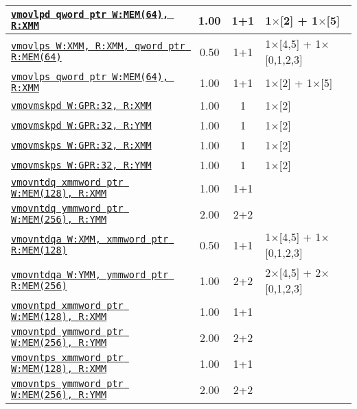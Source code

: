 \documentclass[a4paper,english,fontsize=9]{scrartcl}
\begin{document}
\begin{longtable}{p{}ccL{.25\textwidth}}
  \midrule
  \texttt{\href{https://felixcloutier.com/x86/MOVLPD.html}{vmovlpd qword ptr W:MEM(64), R:XMM}} & 1.00 & 1+1 & 1\(\times\)[2] + 1\(\times\)[5] \\
  \midrule
  \texttt{\href{https://felixcloutier.com/x86/MOVLPS.html}{vmovlps W:XMM, R:XMM, qword ptr R:MEM(64)}} & 0.50 & 1+1 & 1\(\times\)[4,5] + 1\(\times\)[0,1,2,3] \\
  \midrule
  \texttt{\href{https://felixcloutier.com/x86/MOVLPS.html}{vmovlps qword ptr W:MEM(64), R:XMM}} & 1.00 & 1+1 & 1\(\times\)[2] + 1\(\times\)[5] \\
  \midrule
  \texttt{\href{https://felixcloutier.com/x86/MOVMSKPD.html}{vmovmskpd W:GPR:32, R:XMM}} & 1.00 & 1 & 1\(\times\)[2] \\
  \midrule
  \texttt{\href{https://felixcloutier.com/x86/MOVMSKPD.html}{vmovmskpd W:GPR:32, R:YMM}} & 1.00 & 1 & 1\(\times\)[2] \\
  \midrule
  \texttt{\href{https://felixcloutier.com/x86/MOVMSKPS.html}{vmovmskps W:GPR:32, R:XMM}} & 1.00 & 1 & 1\(\times\)[2] \\
  \midrule
  \texttt{\href{https://felixcloutier.com/x86/MOVMSKPS.html}{vmovmskps W:GPR:32, R:YMM}} & 1.00 & 1 & 1\(\times\)[2] \\
  \midrule
  \texttt{\href{https://felixcloutier.com/x86/MOVNTDQ.html}{vmovntdq xmmword ptr W:MEM(128), R:XMM}} & 1.00 & 1+1 &  \\
  \midrule
  \texttt{\href{https://felixcloutier.com/x86/MOVNTDQ.html}{vmovntdq ymmword ptr W:MEM(256), R:YMM}} & 2.00 & 2+2 &  \\
  \midrule
  \texttt{\href{https://felixcloutier.com/x86/MOVNTDQA.html}{vmovntdqa W:XMM, xmmword ptr R:MEM(128)}} & 0.50 & 1+1 & 1\(\times\)[4,5] + 1\(\times\)[0,1,2,3] \\
  \midrule
  \texttt{\href{https://felixcloutier.com/x86/MOVNTDQA.html}{vmovntdqa W:YMM, ymmword ptr R:MEM(256)}} & 1.00 & 2+2 & 2\(\times\)[4,5] + 2\(\times\)[0,1,2,3] \\
  \midrule
  \texttt{\href{https://felixcloutier.com/x86/MOVNTPD.html}{vmovntpd xmmword ptr W:MEM(128), R:XMM}} & 1.00 & 1+1 &  \\
  \midrule
  \texttt{\href{https://felixcloutier.com/x86/MOVNTPD.html}{vmovntpd ymmword ptr W:MEM(256), R:YMM}} & 2.00 & 2+2 &  \\
  \midrule
  \texttt{\href{https://felixcloutier.com/x86/MOVNTPS.html}{vmovntps xmmword ptr W:MEM(128), R:XMM}} & 1.00 & 1+1 &  \\
  \midrule
  \texttt{\href{https://felixcloutier.com/x86/MOVNTPS.html}{vmovntps ymmword ptr W:MEM(256), R:YMM}} & 2.00 & 2+2 &  \\

\end{longtable}
\end{document}

